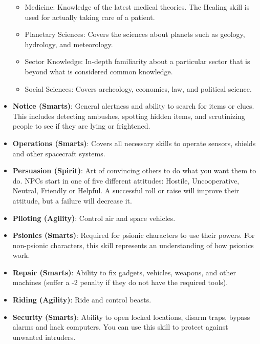 \documentclass[10pt,twoside]{article}
\begin{document}
\begin{multicols}{2}
\begin{itemize}
\begin{itemize}
\item Medicine: Knowledge of the latest medical theories. The Healing skill is used for actually taking care of a patient.

\item Planetary Sciences: Covers the sciences about planets such as geology, hydrology, and meteorology.

\item Sector Knowledge: In-depth familiarity about a particular sector that is beyond what is considered common knowledge.

\item Social Sciences: Covers archeology, economics, law, and political science.

\end{itemize}

\item \textbf{Notice (Smarts)}: General alertness and ability to search for items or clues. This includes detecting ambushes, spotting hidden items, and scrutinizing people to see if they are lying or frightened.

\item \textbf{Operations (Smarts)}: Covers all necessary skills to operate sensors, shields and other spacecraft systems.

\item \textbf{Persuasion (Spirit)}: Art of convincing others to do what you want them to do. NPCs start in one of five different attitudes: Hostile, Uncooperative, Neutral, Friendly or Helpful. A successful roll or raise will improve their attitude, but a failure will decrease it.

\item \textbf{Piloting (Agility)}: Control air and space vehicles.

\item \textbf{Psionics (Smarts)}: Required for psionic characters to use their powers. For non-psionic characters, this skill represents an understanding of how psionics work.

\item \textbf{Repair (Smarts)}: Ability to fix gadgets, vehicles, weapons, and other machines (suffer a -2 penalty if they do not have the required tools).

\item \textbf{Riding (Agility)}: Ride and control beasts.

\item \textbf{Security (Smarts)}: Ability to open locked locations, disarm traps, bypass alarms and hack computers. You can use this skill to protect against unwanted intruders.


\end{itemize}
\end{multicols}
\end{document}
